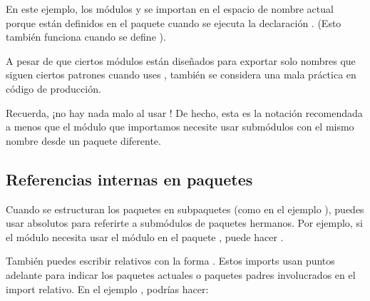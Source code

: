 \documentclass[a4,10pt,spanish]{sphinxmanual}
\begin{document}
\sphinxAtStartPar
En este ejemplo, los módulos  y  se importan en el espacio de nombre actual porque están definidos en el paquete  cuando se ejecuta la declaración .  (Esto también funciona cuando se define ).

\sphinxAtStartPar
A pesar de que ciertos módulos están diseñados para exportar solo nombres que siguen ciertos patrones cuando uses , también se considera una mala práctica en código de producción.

\sphinxAtStartPar
Recuerda, ¡no hay nada malo al usar ! De hecho, esta es la notación recomendada a menos que el módulo que importamos necesite usar submódulos con el mismo nombre desde un paquete diferente.


\subsection{Referencias internas en paquetes}
\label{\detokenize{tutorial/modules:intra-package-references}}\label{\detokenize{tutorial/modules:id2}}
\sphinxAtStartPar
Cuando se estructuran los paquetes en sub\sphinxhyphen{}paquetes (como en el ejemplo ), puedes usar  absolutos para referirte a submódulos de paquetes hermanos.  Por ejemplo, si el módulo  necesita usar el módulo  en el paquete , puede hacer .

\sphinxAtStartPar
También puedes escribir  relativos con la forma .  Estos imports usan puntos adelante para indicar los paquetes actuales o paquetes padres involucrados en el import relativo. En el ejemplo , podrías hacer:

\begin{sphinxVerbatim}[commandchars=\\\{\}]
   
   
   
\end{sphinxVerbatim}
\end{document}

